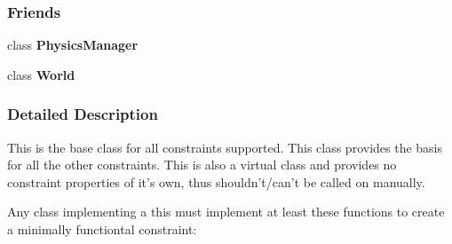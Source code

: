 \subsubsection*{Friends}
\begin{DoxyCompactItemize}
\item 
\hypertarget{classMezzanine_1_1TypedConstraint_a139cf05ac01161b7071c8a037c841683}{
class {\bfseries PhysicsManager}}
\label{classMezzanine_1_1TypedConstraint_a139cf05ac01161b7071c8a037c841683}

\item 
\hypertarget{classMezzanine_1_1TypedConstraint_a7b4bcdf992c21ae83363f25df05b1d25}{
class {\bfseries World}}
\label{classMezzanine_1_1TypedConstraint_a7b4bcdf992c21ae83363f25df05b1d25}

\end{DoxyCompactItemize}


\subsubsection{Detailed Description}
This is the base class for all constraints supported. This class provides the basis for all the other constraints. This is also a virtual class and provides no constraint properties of it's own, thus shouldn't/can't be called on manually. \par
 \par
 Any class implementing a this must implement at least these functions to create a minimally functiontal constraint: \par

